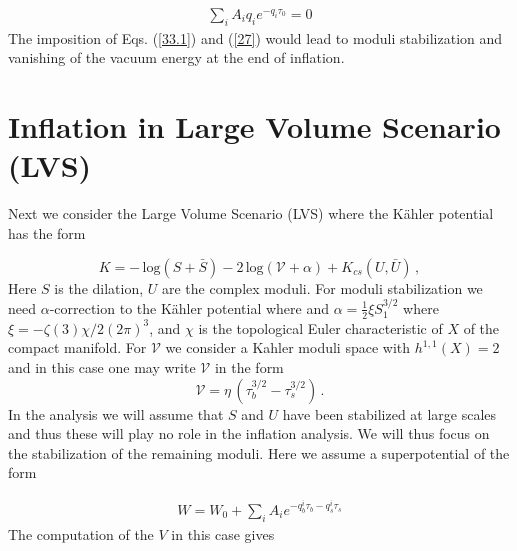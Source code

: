 \documentclass[12pt]{article}
\begin{document}
\begin{align}
  \sum_i A_i q_i e^{-q_i \tau_0}=0
  \label{27}
\end{align}
The imposition of Eqs. (\ref{33.1}) and (\ref{27}) would lead to moduli stabilization and
vanishing of the vacuum energy at the end of inflation. \\


\section{Inflation in Large Volume Scenario (LVS) \label{sec6}}

Next we consider the Large Volume Scenario (LVS) \cite{Balasubramanian:2005zx}
where the K\"ahler potential has the form

\begin{equation}
  K = - \, \text{log} (S+ \bar{S}) -2 \, \text{log} (\mathcal{V} +\alpha)
  + K_{cs} (U, \bar{U})  \, ,
\end{equation}
Here $S$ is the dilation, $U$ are the complex moduli. For moduli stabilization we need $\alpha$-correction to the K\"ahler potential where
and $\alpha = \frac{1}{2} \xi S_1^{3/2}$ where $\xi = -\zeta (3) \chi/2 (2\pi)^3$, and $\chi$ is the topological Euler characteristic of $X$ of the compact manifold. For $\mathcal{V}$ we consider a Kahler moduli space
with $h^{1,1}(X)=2$ and in this case one may write $\mathcal{V}$ in the form
\begin{equation}
  \mathcal{V} = \eta \,( \tau_b^{3/2} - \tau_s^{3/2}) \, .
\end{equation}
In the analysis we will assume that $S$ and $U$ have been stabilized at large scales and thus these will play no role in the
inflation analysis. We will thus focus on the stabilization of the remaining moduli. Here we assume a superpotential of the form

\begin{align}
  W= W_0 +\sum_i A_i e^{-q^i_b \tau_b -q^i_s \tau_s}
\end{align}
The computation of the $V$ in this case gives
\end{document}
